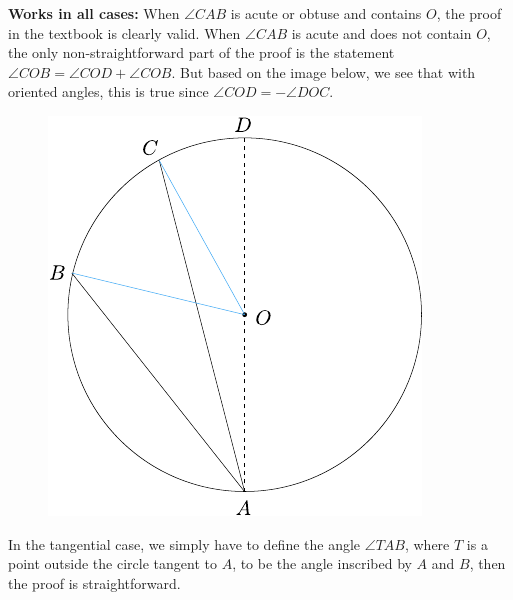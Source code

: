 \documentclass[twoside,10pt]{article}
\begin{document}
\textbf{Works in all cases:} When $\angle CAB$ is acute or obtuse and contains $O$, the proof in the textbook is clearly valid. When $\angle CAB$ is acute and does not contain $O$, the only non-straightforward part of the proof is the statement $\angle COB = \angle COD + \angle COB$. But based on the image below, we see that with oriented angles, this is true since $\angle COD = -\angle DOC$.

\begin{figure}[H]
	\centering
	\includegraphics[scale=1]{fig/107a.pdf}
\end{figure}
In the tangential case, we simply have to define the angle $\angle TAB$, where $T$ is a point outside the circle tangent to $A$, to be the angle inscribed by $A$ and $B$, then the proof is straightforward.

\newpage
\end{document}

